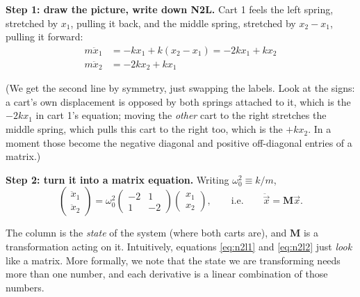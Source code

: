 \documentclass[12pt]{article}
\numberwithin{equation}{section}
\newcommand{\wo}{\omega_0}
\begin{document}
\medskip

\noindent\textbf{Step 1: draw the picture, write down N2L.} Cart 1 feels
the left spring, stretched by $x_1$, pulling it back, and the middle
spring, stretched by $x_2 - x_1$, pulling it forward:
\begin{align}
  m\ddot{x}_1 &= -kx_1 + k(x_2 - x_1) = -2kx_1 + kx_2 \label{eq:n2l1} \\
  m\ddot{x}_2 &= -2kx_2 + kx_1 \label{eq:n2l2}
\end{align}

\noindent (We get the second line by symmetry, just swapping the labels.
Look at the signs: a cart's own displacement is opposed by both springs
attached to it, which is the $-2kx_1$ in cart 1's equation; moving the
\emph{other} cart to the right stretches the middle spring, which pulls
this cart to the right too, which is the $+kx_2$. In a moment those become
the negative diagonal and positive off-diagonal entries of a matrix.)

\medskip

\noindent\textbf{Step 2: turn it into a matrix equation.} Writing
$\wo^2 \equiv k/m$,
\begin{equation}
  \label{eq:matrix}
  \begin{pmatrix} \ddot{x}_1 \\ \ddot{x}_2 \end{pmatrix}
  = \wo^2 \begin{pmatrix} -2 & 1 \\ 1 & -2 \end{pmatrix}
  \begin{pmatrix} x_1 \\ x_2 \end{pmatrix},
  \qquad \textrm{i.e.}\qquad \ddot{\vec{x}} = \mathbf{M}\vec{x}.
\end{equation}

The column is the \emph{state} of the system (where both carts are), and
$\mathbf{M}$ is a transformation acting on it. Intuitively, equations
\eqref{eq:n2l1} and \eqref{eq:n2l2} just \textit{look} like a matrix. More
formally, we note that the state we are transforming needs more than one number,
and each derivative is a linear combination of those numbers.

\medskip
\end{document}
